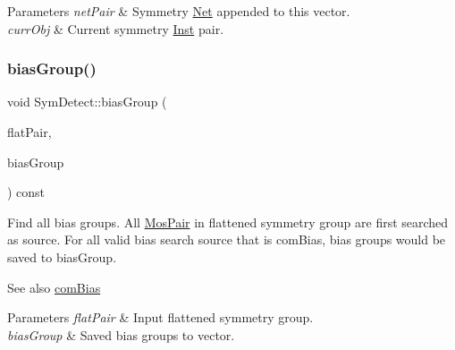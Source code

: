 \begin{DoxyParams}{Parameters}
{\em net\+Pair} & Symmetry \hyperlink{classNet}{Net} appended to this vector. \\
\hline
{\em curr\+Obj} & Current symmetry \hyperlink{classInst}{Inst} pair. \\
\hline
\end{DoxyParams}
\mbox{\label{classSymDetect_a18905625f000221a5d4fe3c7cfdb5e8f}} 
\subsubsection{\texorpdfstring{bias\+Group()}{biasGroup()}}
{\footnotesize\ttfamily void Sym\+Detect\+::bias\+Group (\begin{DoxyParamCaption}\item[{std\+::vector$<$ \hyperlink{classMosPair}{Mos\+Pair} $>$ \&}]{flat\+Pair,  }\item[{std\+::vector$<$ \hyperlink{classBias}{Bias} $>$ \&}]{bias\+Group }\end{DoxyParamCaption}) const\hspace{0.3cm}{\ttfamily [private]}}



Find all bias groups. All \hyperlink{classMosPair}{Mos\+Pair} in flattened symmetry group are first searched as source. For all valid bias search source that is com\+Bias, bias groups would be saved to bias\+Group. 

\begin{DoxySeeAlso}{See also}
\hyperlink{classSymDetect_a13ddc56c5e937097178352eb00d71cf3}{com\+Bias} 
\end{DoxySeeAlso}

\begin{DoxyParams}{Parameters}
{\em flat\+Pair} & Input flattened symmetry group. \\
\hline
{\em bias\+Group} & Saved bias groups to vector. \\
\hline
\end{DoxyParams}
\mbox{\label{classSymDetect_a4c7109dd0519c1c11765fe00f4a21fe2}} 
